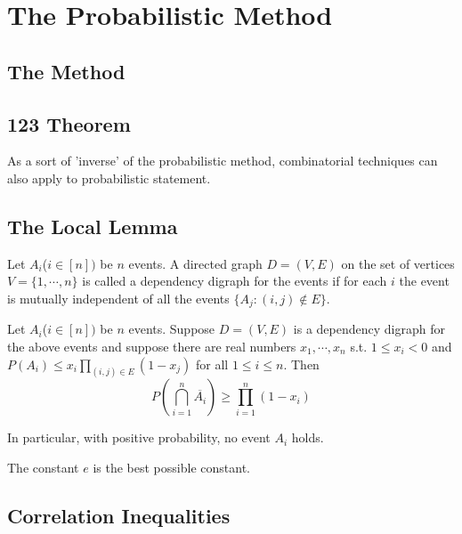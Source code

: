 
\chapter{The Probabilistic Method}
\section{The Method}



\section{123 Theorem}
As a sort of 'inverse' of the probabilistic method, combinatorial techniques can also apply to probabilistic statement.


\section{The Local Lemma}

\begin{definition}
    Let $A_i$($i\in [n])$ be $n$ events. A directed graph $D=(V,E)$ on the set of vertices 
    $V=\{1,\cdots,n\}$ is called a dependency digraph for the events if 
    for each $i$ the event is mutually independent of all the events $\{A_j:(i,j)\notin E\}$.
\end{definition}
\begin{theorem}
    Let $A_i$($i\in [n])$ be $n$ events. Suppose $D=(V,E)$ is a dependency digraph for the above events and 
    suppose there are real numbers $x_1,\cdots,x_n$ s.t. $1\le x_i<0$ and $P(A_i)\le x_i\prod_{(i,j)\in E}(1-x_j)$
    for all $1\le i\le n$. Then 
    \[ P(\bigcap_{i=1}^n\overline{A_i})\ge \prod_{i=1}^n (1-x_i)\] 
\end{theorem}
\begin{remark}
    In particular, with positive probability, no event $A_i$ holds.
\end{remark}

\begin{corollary}
    
\end{corollary}
\begin{remark}
    The constant $e$ is the best possible constant.
\end{remark}


\section{Correlation Inequalities}
\begin{theorem}
    
\end{theorem}



